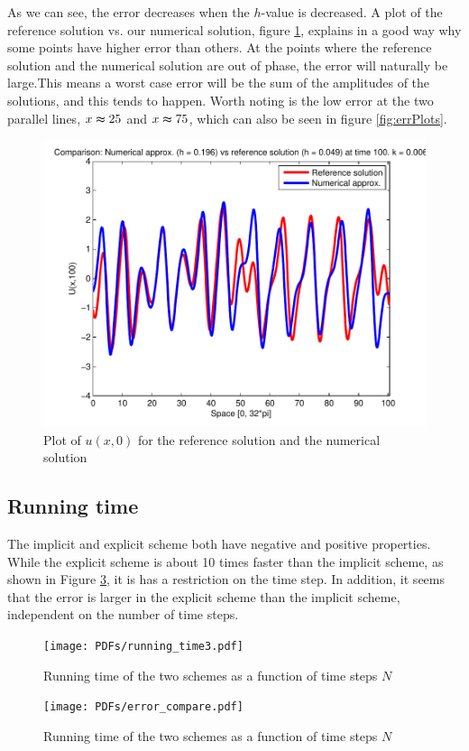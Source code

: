 As we can see, the error decreases when the $h$-value is decreased. A plot of the reference solution vs. our numerical solution, figure \ref{fig:errTime}, explains in a good way why some points have higher error than others. At the points where the reference solution and the numerical solution are out of phase, the error will naturally be large.This means a worst case error will be the sum of the amplitudes of the solutions, and this tends to happen. Worth noting is the low error at the two parallel lines, $x \thickapprox 25$ and $x \thickapprox 75$, which can also be seen in figure \ref{fig:errPlots}. 

\begin{figure}[H]
\centering
\includegraphics[scale=0.55]
{PDFs/IMEX/comp_num_ref_t100.pdf}
\caption{Plot of $u(x,0)$ for the reference solution and the numerical solution}
\label{fig:errTime}
\end{figure}


\subsection*{Running time}

The implicit and explicit scheme both have negative and positive properties. While the explicit scheme is about 10 times faster than the implicit scheme, as shown in Figure \ref{fig:runTime}, it is has a restriction on the time step. In addition, it seems that the error is larger in the explicit scheme than the implicit scheme, independent on the number of time steps. 

\begin{figure}[H]
\centering
\texttt{[image: PDFs/running\_time3.pdf]}
\caption{Running time of the two schemes as a function of time steps $N$}
\label{fig:runTime}
\end{figure}

\begin{figure}[H]
\centering
\texttt{[image: PDFs/error\_compare.pdf]}
\caption{Running time of the two schemes as a function of time steps $N$}
\label{fig:runTime}
\end{figure}

